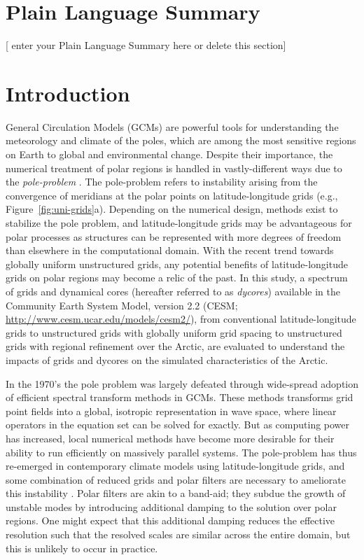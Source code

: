 \documentclass[draft]{agujournal2019}
\begin{document}
\section*{Plain Language Summary}
[ enter your Plain Language Summary here or delete this section]


%
%

\section{Introduction}

General Circulation Models (GCMs) are powerful tools for understanding the meteorology and climate of the poles, which are among the most sensitive regions on Earth to global and environmental change. Despite their importance, the numerical treatment of polar regions is handled in vastly-different ways due to the \textit{pole-problem} \cite{W2007JMSJ}. The pole-problem refers to instability arising from the convergence of meridians at the polar points on latitude-longitude grids (e.g., Figure~\ref{fig:uni-grids}a). Depending on the numerical design, methods exist to stabilize the pole problem, and latitude-longitude grids may be advantageous for polar processes as structures can be represented with more degrees of freedom than elsewhere in the computational domain. With the recent trend towards globally uniform unstructured grids, any potential benefits of latitude-longitude grids on polar regions may become a relic of the past. In this study, a spectrum of grids and dynamical cores (hereafter referred to as \textit{dycores}) available in the Community Earth System Model, version 2.2 (CESM; \url{http://www.cesm.ucar.edu/models/cesm2/}), from conventional latitude-longitude grids to unstructured grids with globally uniform grid spacing to unstructured grids with regional refinement over the Arctic, are evaluated to understand the impacts of grids and dycores on the simulated characteristics of the Arctic.

In the 1970's the pole problem was largely defeated through wide-spread adoption of efficient spectral transform methods in GCMs. These methods transforms grid point fields into a global, isotropic representation in wave space, where linear operators in the equation set can be solved for exactly. But as computing power has increased, local numerical methods have become more desirable for their ability to run efficiently on massively parallel systems. The pole-problem has thus re-emerged in contemporary climate models using latitude-longitude grids, and some combination of reduced grids and polar filters are necessary to ameliorate this instability \cite{JW2010LNCSE}. Polar filters are akin to a band-aid; they subdue the growth of unstable modes by introducing additional damping to the solution over polar regions. One might expect that this additional damping reduces the effective resolution such that the resolved scales are similar across the entire domain, but this is unlikely to occur in practice.
\end{document}

